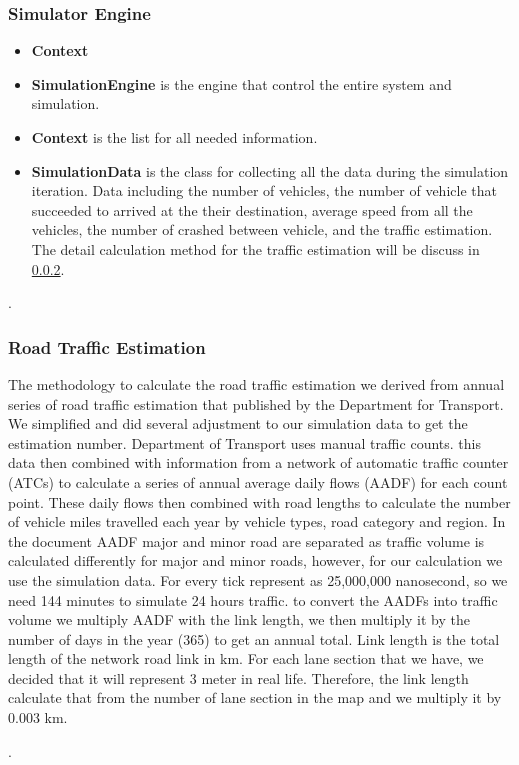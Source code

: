 \documentclass[11pt]{article}
\begin{document}
\begin{itemize}
\subsubsection{Simulator Engine}
        
\begin{itemize}[noitemsep]
\item \textbf{Context} 
\item \textbf{SimulationEngine} is the engine that control the entire system and simulation.
\item \textbf{Context} is the list for all needed information.
\item \textbf{SimulationData} is the class for collecting all the data during the simulation iteration. Data including the number of vehicles, the number of vehicle that succeeded to arrived at the their destination, average speed from all the vehicles, the number of crashed between vehicle, and the traffic estimation. The detail calculation method for the traffic estimation will be discuss in \ref{rte}.
\end{itemize}.

\subsubsection{Road Traffic Estimation} \label{rte}
The methodology to calculate the road traffic estimation we derived from annual series of road traffic estimation that published by the Department for Transport. We simplified and did several adjustment to our simulation data to get the estimation number. Department of Transport uses manual traffic counts. this data then combined with information from a network of automatic traffic counter (ATCs) to calculate a series of annual average daily flows (AADF) for each count point. These daily flows then combined with road lengths to calculate the number of vehicle miles travelled each year by vehicle types, road category and region. In the document AADF major and minor road are separated as traffic volume is calculated differently for major and minor roads, however, for our calculation we use the simulation data. For every tick represent as 25,000,000 nanosecond, so we need 144 minutes to simulate 24 hours traffic. 
to convert the AADFs into traffic volume we multiply AADF with the link length, we then multiply it by the number of days in the year (365) to get an annual total. Link length is the total length of the network road link in km. For each lane section that we have, we decided that it will represent 3 meter in real life. Therefore, the link length calculate that from the number of lane section in the map and we multiply it by 0.003 km. 
\end{itemize}.
	
\end{document}
